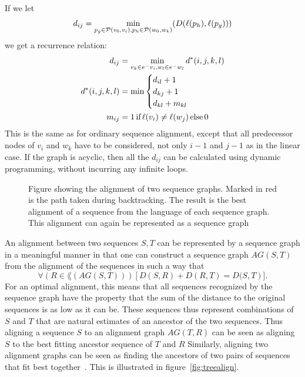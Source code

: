 If we let 
\[
  d_{ij} = \min_{p_g \in \paths(v_0, v_i), p_h \in \paths(w_0, w_k)}(D(\slabel(p_h), \slabel(p_g)))
\]  we get a recurrence relation:
\begin{align*}
  d_{ij} &= \min_{v_k \in \preds{v_i}, w_l \in \preds{w_l}} d^*(i, j, k, l)\\
  d^*(i, j, k, l) &= \min \begin{cases}
    d_{il} + 1\\
    d_{kj} + 1\\
    d_{kl} + m_{kl}\\
    \end{cases}    
    \\
    m_{ij} &= 1\, \text{if}\, \slabel(v_i) \neq \slabel(w_j)\, \text{else}\, 0\\
\end{align*}
This is the same as for ordinary sequence alignment, except that all predecessor nodes of $v_i$ and $w_k$ have to be considered, not only $i-1$ and $j-1$ as in the linear case. If the graph is acyclic, then all the $d_{ij}$ can be calculated using dynamic programming, without incurring any infinite loops.
\begin{figure}
  \begin{tikzpicture}
    
  \end{tikzpicture}
  \caption{Figure showing the alignment of two sequence graphs. Marked in red is the path taken during backtracking. The result is the best alignment of a sequence from the language of each sequence graph. This alignment can again be represented as a sequence graph}
    \label{fig:seqgrapha}
\end{figure}

An alignment between two sequences $S, T$ can be represented by a sequence graph in a meaningful manner in that one can construct a sequence graph $AG(S, T)$ from the alignment of the sequences in such a way that 
\[
\forall (R \in \lang(AG(S, T)))\left[D(S, R)+D(R, T) =  D(S, T\right)].
\]
For an optimal alignment, this means that all sequences recognized by the sequence graph have the property that the sum of the distance to the original sequences is as low as it can be.
These sequences thus represent combinations of $S$ and $T$ that are natural estimates of an ancestor of the two sequences.
Thus aligning a sequence $S$ to an alignment graph $AG(T, R)$  can be seen as aligning $S$ to the best fitting ancestor sequence of $T$ and $R$
Similarly, aligning two alignment graphs can be seen as finding the ancestors of two pairs of sequences that fit best together~\cite{treealign}. This is illustrated in figure~\ref{fig:treealign}.

